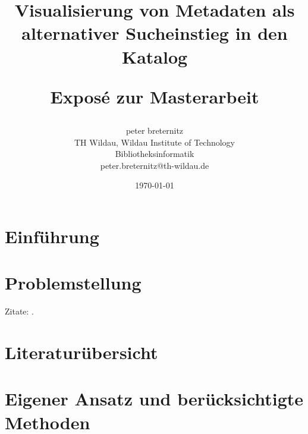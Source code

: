 \documentclass[10pt,a4paper,twocolumn]{article}
\begin{document}
\title{{\bf Visualisierung von Metadaten als alternativer Sucheinstieg in den
        Katalog } \\ \begin{large}Exposé zur Masterarbeit                                                                             \end{large}}
\author{
	peter breternitz \\
	TH Wildau, Wildau Institute of Technology\\ Bibliotheksinformatik \\
	peter.breternitz@th-wildau.de
}
\date{\today}

\maketitle

\section{Einführung} 
\blindtext

\section{Problemstellung} 
\blindtext
Zitate: \cite{Harrison75a, Harrison78a}.

\section{Literaturübersicht}

\blindtext
\section{Eigener Ansatz und berücksichtigte Methoden} 
\blindtext



 
\end{document}
